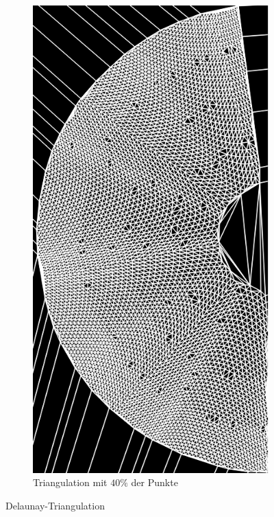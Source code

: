 \begin{figure}[!htb]
\begin{subfigure}{.9\textwidth}
		\includegraphics[angle=-90, width=.8\textwidth]{images/delaunay2.png}
		\caption{Triangulation mit $40\%$ der Punkte}
	\end{subfigure}
	\caption{Delaunay-Triangulation}
	\label{fig:delaunayTriag}
\end{figure}


